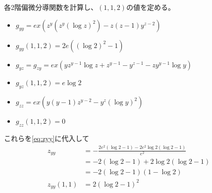 \begin{souanswer}
\begin{enumerate}
\begin{enumerate_roman}
	各2階偏微分導関数を計算し、$(1, 1, 2)$の値を定める。
\begin{itemize}
	\item $g_{yy}= ex(z^y(z^y(\log{z})^2)- z(z- 1)y^{z- 2})$
	\item[$\Rightarrow$] $g_{yy}(1, 1, 2)= 2e((\log{2})^2- 1)$ 
	\item $g_{yz}= g_{zy}= ex(yz^{y- 1}\log{z}+ z^{y- 1}- y^{z- 1}- zy^{y- 1}\log{y})$
	\item[$\Rightarrow$] $g_{yz}(1, 1, 2)= e\log{2}$
	\item $g_{zz}= ex(y(y- 1)z^{y- 2}- y^z(\log{y})^2)$
	\item[$\Rightarrow$] $g_{zz}(1, 1, 2)= 0$
\end{itemize}
	これらを\eqref{eq:zyy}に代入して
\begin{align*}
	z_{yy}
	&= -\frac{2e^2(\log{2}- 1)- 2e^2\log{2}(\log{2}- 1)}{e^2}\\
	&= -2(\log{2}- 1)+ 2\log{2}(\log{2}- 1)\\
	&= -2(\log{2}- 1)(1- \log{2})\\
	z_{yy}(1, 1)
	&= 2(\log{2}- 1)^2
\end{align*}
\end{enumerate_roman}
\end{enumerate}
\end{souanswer}